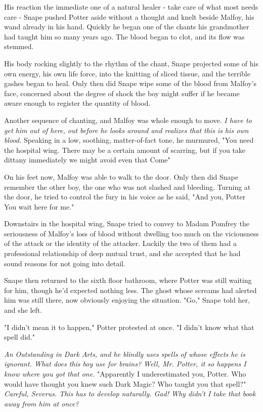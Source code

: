 His reaction the immediate one of a natural healer - take care of what most needs care - Snape pushed Potter aside without a thought and knelt beside Malfoy, his wand already in his hand. Quickly he began one of the chants his grandmother had taught him so many years ago. The blood began to clot, and its flow was stemmed.

His body rocking slightly to the rhythm of the chant, Snape projected some of his own energy, his own life force, into the knitting of sliced tissue, and the terrible gashes began to heal. Only then did Snape wipe some of the blood from Malfoy's face, concerned about the degree of shock the boy might suffer if he became aware enough to register the quantity of blood.

Another sequence of chanting, and Malfoy was whole enough to move. \emph{I have to get him out of here, out before he looks around and realizes that this is his own blood.} Speaking in a low, soothing, matter-of-fact tone, he murmured, "You need the hospital wing. There may be a certain amount of scarring, but if you take dittany immediately we might avoid even that{\el} Come{\el}"

On his feet now, Malfoy was able to walk to the door. Only then did Snape remember the other boy, the one who was not slashed and bleeding. Turning at the door, he tried to control the fury in his voice as he said, "And you, Potter{\el} You wait here for me."

Downstairs in the hospital wing, Snape tried to convey to Madam Pomfrey the seriousness of Malfoy's loss of blood without dwelling too much on the viciousness of the attack or the identity of the attacker. Luckily the two of them had a professional relationship of deep mutual trust, and she accepted that he had sound reasons for not going into detail.

Snape then returned to the sixth floor bathroom, where Potter was still waiting for him, though he'd expected nothing less. The ghost whose screams had alerted him was still there, now obviously enjoying the situation. "Go," Snape told her, and she left.

"I didn't mean it to happen," Potter protested at once. "I didn't know what that spell did."

\emph{An Outstanding in Dark Arts, and he blindly uses spells of whose effects he is ignorant. What does this boy use for brains? Well, Mr. Potter, it so happens I know where you got that one.} "Apparently I underestimated you, Potter. Who would have thought you knew such Dark Magic? Who taught you that spell?" \emph{Careful, Severus. This has to develop naturally. Gad! Why didn't I take that book away from him at once?}

